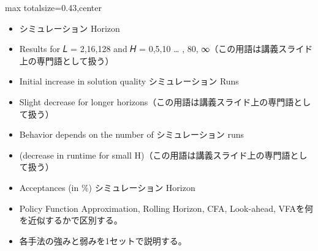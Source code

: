 \clearpage
{}
\begin{minipage}[t]{0.405\textwidth}
\begin{adjustbox}{max totalsize={\textwidth}{0.43\textheight},center}
\begin{minipage}{\textwidth}\scriptsize
{}\begin{itemize}
\item シミュレーション Horizon
\item Results for 𝐿 = 2,16,128 and 𝐻 = 0,5,10 … , 80, ∞（この用語は講義スライド上の専門語として扱う）
\item Initial increase in solution quality シミュレーション Runs
\item Slight decrease for longer horizons（この用語は講義スライド上の専門語として扱う）
\item Behavior depends on the number of シミュレーション runs
\item (decrease in runtime for small H)（この用語は講義スライド上の専門語として扱う）
\item Acceptances (in \%) シミュレーション Horizon
\end{itemize}\begin{itemize}
\item Policy Function Approximation, Rolling Horizon, CFA, Look-ahead, VFAを何を近似するかで区別する。
\item 各手法の強みと弱みを1セットで説明する。
\end{itemize}
\end{minipage}
\end{adjustbox}
\end{minipage}\hfill
